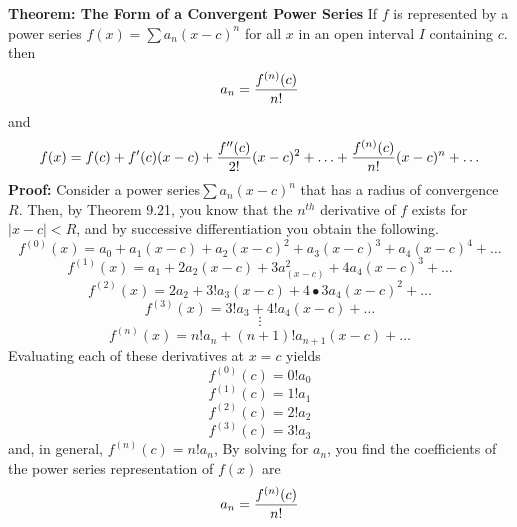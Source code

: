 \nopagenumbers
{\bf Theorem: The Form of a Convergent Power Series}
\vskip 6pt
If $f$ is represented by a power series $f(x)=\sum a_n(x-c)^n$ for all $x$ in an open interval $I$ containing $c$. then $$a_n={f^{(n)}(c)\over n!}$$ and $$ f(x)=f(c)+f'(c)(x-c)+{f''(c)\over 2!}(x-c)^2+\ldots+{f^{(n)}(c)\over n!}(x-c)^n+\ldots$$
\vskip 10pt
{\bf Proof:}
\vskip 6pt
Consider a power series$\sum a_n(x-c)^n$ that has a radius of convergence $R$. Then, by Theorem 9.21, you know that the $n^{th}$ derivative of $f$ exists for $|x-c|<R$, and by successive differentiation you obtain the following.
$$f^{(0)}(x)=a_0+a_1(x-c)+a_2(x-c)^2+a_3(x-c)^3+a_4(x-c)^4+\ldots$$
$$f^{(1)}(x)=a_1+2a_2(x-c)+3a_(x-c)^2+4a_4(x-c)^3+\ldots$$
$$f^{(2)}(x)=2a_2+3!a_3(x-c)+4\bullet 3a_4(x-c)^2+\ldots$$
$$f^{(3)}(x)=3!a_3+4!a_4(x-c)+\ldots$$
$$\vdots$$
$$f^{(n)}(x)=n!a_n+(n+1)!a_{n+1}(x-c)+\ldots$$
Evaluating each of these derivatives at $x=c$ yields
$$f^{(0)}(c)=0!a_0$$
$$f^{(1)}(c)=1!a_1$$
$$f^{(2)}(c)=2!a_2$$
$$f^{(3)}(c)=3!a_3$$
and, in general, $f^{(n)}(c)=n!a_n$, By solving for $a_n$, you find the coefficients of the power series representation of $f(x)$ are $$a_n={f^{(n)}(c)\over n!}$$

\vfill\eject
